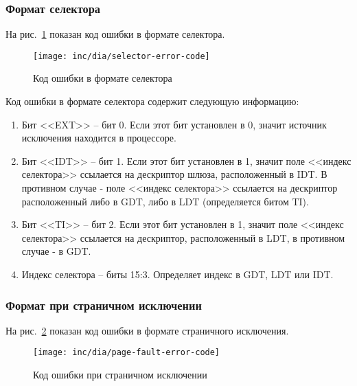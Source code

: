 \subsubsection*{Формат селектора}
На рис.~\ref{fig:selector_error_code} показан код ошибки в формате селектора.
\begin{figure}[ht!]
  \centering
  \texttt{[image: inc/dia/selector-error-code]}
  \caption{Код ошибки в формате селектора}
  \label{fig:selector_error_code}
\end{figure}

Код ошибки в формате селектора содержит следующую информацию:
\begin{enumerate}[1.]
\item Бит <<EXT>> -- бит 0. Если этот бит установлен в 0, значит источник
	исключения находится в процессоре.
\item Бит <<IDT>> -- бит 1. Если этот бит установлен в 1, значит поле <<индекс
селектора>> ссылается на дескриптор шлюза, расположенный в IDT. В
противном случае - поле <<индекс селектора>> ссылается на дескриптор
расположенный либо в GDT, либо в LDT (определяется битом TI).
\item Бит <<TI>> -- бит 2. Если этот бит установлен в 1, значит поле <<индекс
селектора>> ссылается на дескриптор, расположенный в LDT, в противном случае -
в GDT.
\item Индекс селектора -- биты 15:3. Определяет индекс в GDT, LDT или IDT.
\end{enumerate}

\subsubsection*{Формат при страничном исключении}
На рис.~\ref{fig:page_fault_error_code} показан код ошибки в формате страничного исключения.

\begin{figure}[ht!]
  \centering
  \texttt{[image: inc/dia/page-fault-error-code]}
  \caption{Код ошибки при страничном исключении}
  \label{fig:page_fault_error_code}
\end{figure}

